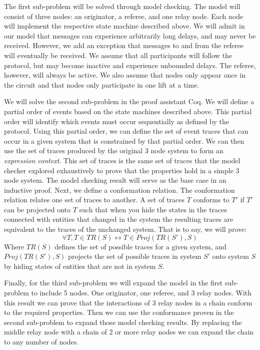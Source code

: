 \documentclass[article, onecolumn, 12pt]{IEEEtran}
\begin{document}
The first sub-problem will be solved through model checking. The model will consist of three nodes: an originator, a referee, and one relay node. Each node will implement the respective state machine described above. We will admit in our model that messages can experience arbitrarily long delays, and may never be received. However, we add an exception that messages to and from the referee will eventually be received.  We assume that all participants will follow the protocol, but may become inactive and experience unbounded delays.  The referee, however, will always be active. We also assume that nodes only appear once in the circuit and that nodes only participate in one lift at a time.

We will solve the second sub-problem in the proof assistant Coq. We will define a partial order of events based on the state machines described above. This partial order will identify which events must occur sequentially as defined by the protocol. Using this partial order, we can define the set of event traces that can occur in a given system that is constrained by that partial order. 
We can then use the set of traces produced by the original 3 node system to form an \emph{expression context}. This set of traces is the same set of traces that the model checker explored exhaustively to prove that the properties hold in a simple 3 node system.
The model checking result will serve as the base case in an inductive proof. Next, we define a conformation relation. The conformation relation relates one set of traces to another. A set of traces $T$ conforms to $T'$ if $T'$ can be projected onto $T$ such that when you hide the states in the traces connected with entities that changed in the system the resulting traces are equivalent to the traces of the unchanged system. That is to say, we will prove:
$$\forall T, T \in TR(S) \longleftrightarrow T \in Proj(TR(S'), S)$$
Where $TR(S)$ defines the set of possible traces for a given system, and $Proj(TR(S'), S)$ projects the set of possible traces in system $S'$ onto system $S$ by hiding states of entities that are not in system $S$. 

Finally, for the third sub-problem we will expand the model in the first sub-problem to include 5 nodes. One originator, one referee, and 3 relay nodes. With this result we can prove that the interactions of 3 relay nodes in a chain conform to the required properties. Then we can use the conformance proven in the second sub-problem to expand those model checking results. By replacing the middle relay node with a chain of 2 or more relay nodes we can expand the chain to any number of nodes. 
\end{document}

